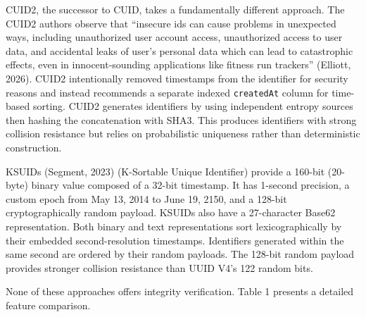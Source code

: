 \documentclass[fleqn,10pt]{wlpeerj}
\begin{document}
CUID2, the successor to CUID, takes a fundamentally different approach.
The CUID2 authors observe that ``insecure ids can cause problems in
unexpected ways, including unauthorized user account access,
unauthorized access to user data, and accidental leaks of user's
personal data which can lead to catastrophic effects, even in
innocent-sounding applications like fitness run trackers'' (Elliott,
2026). CUID2 intentionally removed timestamps from the identifier for
security reasons and instead recommends a separate indexed
\texttt{createdAt} column for time-based sorting. CUID2 generates
identifiers by using independent entropy sources then hashing the
concatenation with SHA3. This produces identifiers with strong collision
resistance but relies on probabilistic uniqueness rather than
deterministic construction.

KSUIDs (Segment, 2023) (K-Sortable Unique Identifier) provide a 160-bit
(20-byte) binary value composed of a 32-bit timestamp. It has 1-second
precision, a custom epoch from May 13, 2014 to June 19, 2150, and a
128-bit cryptographically random payload. KSUIDs also have a
27-character Base62 representation. Both binary and text representations
sort lexicographically by their embedded second-resolution timestamps.
Identifiers generated within the same second are ordered by their random
payloads. The 128-bit random payload provides stronger collision
resistance than UUID V4's 122 random bits.

None of these approaches offers integrity verification. Table 1 presents
a detailed feature comparison.
\end{document}
